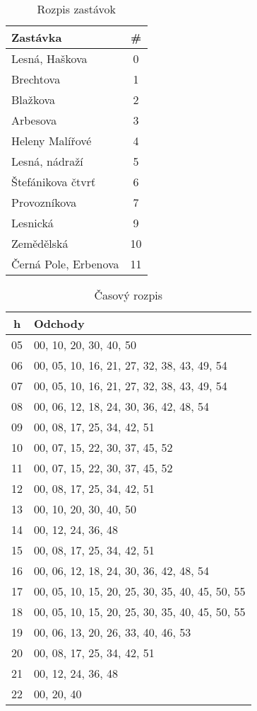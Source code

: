 \begin{table}[h]
  \centering
  \begin{tabular}{|l|c|}
    \hline
    \textbf{Zastávka} & \# \\ \hline
    Lesná, Haškova & 0 \\ \hline
    Brechtova & 1 \\ \hline
    Blažkova & 2 \\ \hline
    Arbesova & 3 \\ \hline
    Heleny Malířové & 4 \\ \hline
    Lesná, nádraží & 5 \\ \hline
    Štefánikova čtvrť & 6 \\ \hline
    Provozníkova & 7 \\ \hline
    Lesnická & 9 \\ \hline
    Zemědělská & 10 \\ \hline
    Černá Pole, Erbenova & 11 \\ \hline
  \end{tabular}
  \caption{Rozpis zastávok}
\end{table}

\begin{table}[h]
  \centering
  \begin{tabular}{|c|l|}
    \hline
    \textbf{h} & \textbf{Odchody} \\ \hline
    05 & 00, 10, 20, 30, 40, 50 \\ \hline
    06 & 00, 05, 10, 16, 21, 27, 32, 38, 43, 49, 54 \\ \hline
    07 & 00, 05, 10, 16, 21, 27, 32, 38, 43, 49, 54 \\ \hline
    08 & 00, 06, 12, 18, 24, 30, 36, 42, 48, 54 \\ \hline
    09 & 00, 08, 17, 25, 34, 42, 51 \\ \hline
    10 & 00, 07, 15, 22, 30, 37, 45, 52 \\ \hline
    11 & 00, 07, 15, 22, 30, 37, 45, 52 \\ \hline
    12 & 00, 08, 17, 25, 34, 42, 51 \\ \hline
    13 & 00, 10, 20, 30, 40, 50 \\ \hline
    14 & 00, 12, 24, 36, 48 \\ \hline
    15 & 00, 08, 17, 25, 34, 42, 51 \\ \hline
    16 & 00, 06, 12, 18, 24, 30, 36, 42, 48, 54 \\ \hline
    17 & 00, 05, 10, 15, 20, 25, 30, 35, 40, 45, 50, 55 \\ \hline
    18 & 00, 05, 10, 15, 20, 25, 30, 35, 40, 45, 50, 55 \\ \hline
    19 & 00, 06, 13, 20, 26, 33, 40, 46, 53 \\ \hline
    20 & 00, 08, 17, 25, 34, 42, 51 \\ \hline
    21 & 00, 12, 24, 36, 48 \\ \hline
    22 & 00, 20, 40 \\ \hline
  \end{tabular}
  \caption{Časový rozpis}
\end{table}
